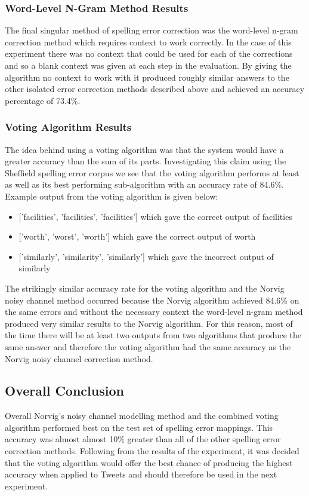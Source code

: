 \subsubsection{Word-Level N-Gram Method Results}
The final singular method of spelling error correction was the word-level n-gram correction method which requires context to work correctly. In the case of this experiment there was no context that could be used for each of the corrections and so a blank context was given at each step in the evaluation. By giving the algorithm no context to work with it produced roughly similar answers to the other isolated error correction methods described above and achieved an accuracy percentage of 73.4\%.

\subsubsection{Voting Algorithm Results}
The idea behind using a voting algorithm was that the system would have a greater accuracy than the sum of its parts. Investigating this claim using the Sheffield spelling error corpus we see that the voting algorithm performs at least as well as its best performing sub-algorithm with an accuracy rate of 84.6\%. Example output from the voting algorithm is given below:
\begin{itemize}
\item {['facilities', 'facilities', 'facilities']} which gave the correct output of facilities
\item {['worth', 'worst', 'worth']} which gave the correct output of worth
\item {['similarly', 'similarity', 'similarly']} which gave the incorrect output of similarly
\end{itemize}
The strikingly similar accuracy rate for the voting algorithm and the Norvig noisy channel method occurred because the Norvig algorithm achieved 84.6\% on the same errors and without the necessary context the word-level n-gram method produced very similar results to the Norvig algorithm. For this reason, most of the time there will be at least two outputs from two algorithms that produce the same answer and therefore the voting algorithm had the same accuracy as the Norvig noisy channel correction method.

\subsection{Overall Conclusion}
Overall Norvig's noisy channel modelling method and the combined voting algorithm performed best on the test set of spelling error mappings. This accuracy was almost almost 10\% greater than all of the other spelling error correction methods. Following from the results of the experiment, it was decided that the voting algorithm would offer the best chance of producing the highest accuracy when applied to Tweets and should therefore be used in the next experiment.

